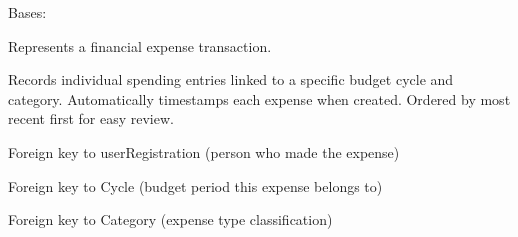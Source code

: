 \documentclass[letterpaper,10pt,english]{sphinxmanual}
\begin{document}
\begin{fulllineitems}
\label{\detokenize{expensesApp:expensesApp.models.Expense}}
\pysigstartsignatures
\pysiglinewithargsret
{}
{\sphinxparamcomma {}}
{}
\pysigstopsignatures
\sphinxAtStartPar
Bases: 

\sphinxAtStartPar
Represents a financial expense transaction.

\sphinxAtStartPar
Records individual spending entries linked to a specific budget cycle
and category. Automatically timestamps each expense when created.
Ordered by most recent first for easy review.

\begin{fulllineitems}
\label{\detokenize{expensesApp:expensesApp.models.Expense.user}}
\pysigstartsignatures
\pysigline
{}
\pysigstopsignatures
\sphinxAtStartPar
Foreign key to userRegistration (person who made the expense)

\end{fulllineitems}


\begin{fulllineitems}
\label{\detokenize{expensesApp:expensesApp.models.Expense.cycle}}
\pysigstartsignatures
\pysigline
{}
\pysigstopsignatures
\sphinxAtStartPar
Foreign key to Cycle (budget period this expense belongs to)

\end{fulllineitems}


\begin{fulllineitems}
\label{\detokenize{expensesApp:expensesApp.models.Expense.category}}
\pysigstartsignatures
\pysigline
{}
\pysigstopsignatures
\sphinxAtStartPar
Foreign key to Category (expense type classification)


\end{fulllineitems}
\end{fulllineitems}
\end{document}
